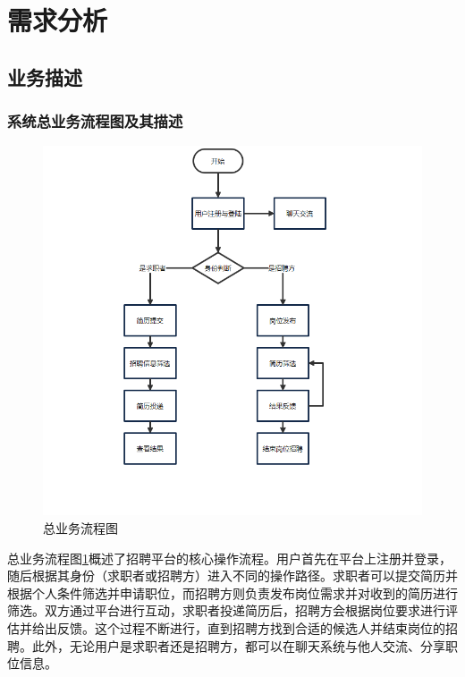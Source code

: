 \documentclass[UTF8,a4paper,10pt]{ctexart}
\begin{document}
\section{需求分析}

\subsection{业务描述}

\subsubsection{系统总业务流程图及其描述}

\begin{figure}[H]
    \centering
    \includegraphics[width=\textwidth]{img/总业务流程图.png}
    \caption{总业务流程图}
    \label{fig:总业务流程图}
\end{figure}

总业务流程图\ref{fig:总业务流程图}概述了招聘平台的核心操作流程。用户首先在平台上注册并登录，随后根据其身份（求职者或招聘方）进入不同的操作路径。求职者可以提交简历并根据个人条件筛选并申请职位，而招聘方则负责发布岗位需求并对收到的简历进行筛选。双方通过平台进行互动，求职者投递简历后，招聘方会根据岗位要求进行评估并给出反馈。这个过程不断进行，直到招聘方找到合适的候选人并结束岗位的招聘。此外，无论用户是求职者还是招聘方，都可以在聊天系统与他人交流、分享职位信息。
\end{document}
